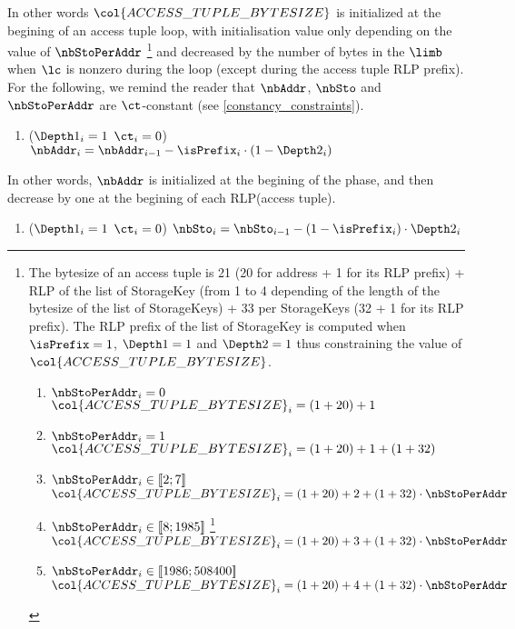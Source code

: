 In other words $\col{ACCESS\_TUPLE\_BYTESIZE}$ is initialized at the begining of an access tuple loop, with initialisation value only depending on the value of $\nbStoPerAddr$ 
				\footnote{The bytesize of an access tuple is 21 (20 for address + 1 for its RLP prefix) + RLP of the list of StorageKey (from 1 to 4 depending of the length of the bytesize of the list of StorageKeys) + 33 per StorageKeys (32 + 1 for its RLP prefix). The RLP prefix of the list of StorageKey is computed when $\isPrefix = 1$, $\Depth 1 =1$ and $\Depth 2 = 1$ thus constraining the value of $\col{ACCESS\_TUPLE\_BYTESIZE}$.
					    \begin{enumerate}
							\item \If $\nbStoPerAddr_{i}=0$ \Then $\col{ACCESS\_TUPLE\_BYTESIZE}_{i}=(1+20) + 1$
							\item \If $\nbStoPerAddr_{i}=1$ \Then $\col{ACCESS\_TUPLE\_BYTESIZE}_{i}=(1+20) + 1 + (1+32)$
							\item \If $\nbStoPerAddr_{i} \in [\![ 2 ; 7 ]\!] $ \Then $\col{ACCESS\_TUPLE\_BYTESIZE}_{i}= (1+20) + 2 + (1+32) \cdot \nbStoPerAddr$
							\item \If $\nbStoPerAddr_{i} \in [\![ 8 ; 1985  ]\!]$ \footnote{In this case the bytesize of $\nbStoPerAddr$ RLP(StorageKey) is a two bytes integer.} \Then $\col{ACCESS\_TUPLE\_BYTESIZE}_{i}= (1+20) + 3 + (1+32) \cdot \nbStoPerAddr$
							\item \If $\nbStoPerAddr_{i} \in [\![ 1986 ; 508400]\!]$ \Then $\col{ACCESS\_TUPLE\_BYTESIZE}_{i}= (1+20) + 4 + (1+32) \cdot \nbStoPerAddr$
					    \end{enumerate}
						}
and decreased by the number of bytes in the $\limb$ when $\lc$ is nonzero during the loop (except during the access tuple RLP prefix).
\newline
For the following, we remind the reader that $\nbAddr$, $\nbSto$ and $\nbStoPerAddr$ are $\ct$-constant (see \ref{constancy_constraints}).
\begin{enumerate}[resume]
    \item \If ($\Depth1_{i}=1$ \et $\ct_{i}=0$) \Then $\nbAddr_{i} = \nbAddr_{i-1} - \isPrefix_{i} \cdot (1 - \Depth2_{i})$
\end{enumerate}
In other words, $\nbAddr$ is initialized at the begining of the phase, and then decrease by one at the begining of each RLP(access tuple).
\begin{enumerate}[resume]    
    \item \If ($\Depth1_{i}=1$ \et $\ct_{i}=0$) \Then $\nbSto_{i} = \nbSto_{i-1} - (1- \isPrefix_{i}) \cdot \Depth2_{i}$
\end{enumerate}
